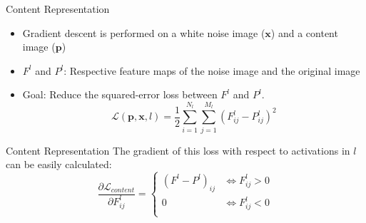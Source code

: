 \documentclass{beamer}
\begin{document}
\begin{frame}{Content Representation}
    \begin{itemize}
        \item Gradient descent is performed on a white noise image
            ($\mathbf{x}$) and a content image
            ($\mathbf{p}$)
        \item $F^l$ and $P^l$: Respective feature maps of the
            noise image and the original image
        \item Goal: Reduce the squared-error loss between $F^l$ and $P^l$.
    \begin{equation}
        \mathcal{L}(\mathbf{p}, \mathbf{x}, l) =
        \frac{1}{2} \sum_{i=1}^{N_l}\sum_{j=1}^{M_l}{(F^l_{ij} - P^l_{ij})^2}
    \end{equation}
    \end{itemize}
\end{frame}

\begin{frame}{Content Representation}
    The gradient of this loss with respect to activations in $l$ can be easily
    calculated:
    \begin{equation}
        \frac{\partial \mathcal{L}_{content}}{\partial F^l_{ij}}
        =
        \begin{cases}
            (F^l - P^l)_{ij} & \iff F^l_{ij} > 0 \\
            0 & \iff F^l_{ij} < 0 \\
        \end{cases}
    \end{equation}
\end{frame}
\end{document}
